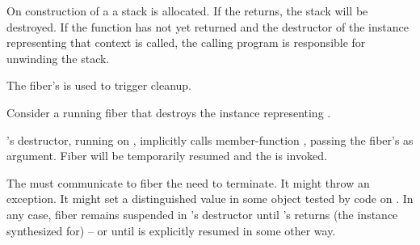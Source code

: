 \label{destruction}

On construction of a \fiber a stack is allocated. If the \entryfn returns,
the stack will be destroyed. If the function has not yet returned and the
destructor of the \fiber instance representing that context is called,
the calling program is responsible for unwinding the stack.

The fiber's \cancelfn is used to trigger cleanup.

Consider a running fiber  that destroys the \fiber instance
representing .

's destructor, running on , implicitly calls member-function
\resumewith, passing the fiber's \cancelfn as
argument. Fiber  will be temporarily resumed and the \cancelfn is
invoked.

The \cancelfn must communicate to fiber  the need to terminate. It
might throw an exception. It might set a distinguished value in some object
tested by code on . In any case, fiber  remains suspended
in 's destructor until 's \entryfn returns (the \fiber
instance synthesized for)  -- or until  is explicitly resumed
in some other way.


